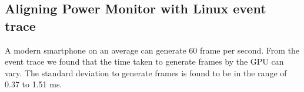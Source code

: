 \subsection{Aligning Power Monitor with Linux event trace}
A modern smartphone on an average can generate 60 frame per second. 
From the event trace we found that the time taken to generate frames by the GPU can vary.
The standard deviation to generate frames is found to be in  the range of 0.37 to 1.51 ms.
